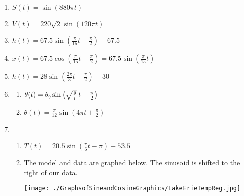 \documentclass{ximera}
\begin{document}
\begin{enumerate}
\setcounter{enumi}{\value{HW}}



\item  $S(t) = \sin\left(880\pi t\right)$

\item  $V(t) = 220 \sqrt{2} \sin\left(120\pi t\right)$


\item  $h(t) = 67.5 \sin\left(\frac{\pi}{15} t - \frac{\pi}{2} \right) + 67.5$

\item  $x(t) = 67.5 \cos\left(\frac{\pi}{15} t - \frac{\pi}{2} \right) = 67.5 \sin\left(\frac{\pi}{15} t \right)$


\item  $h(t) = 28\sin\left(\frac{2\pi}{3} t - \frac{\pi}{2}\right) + 30$


\item  

\begin{multicols}{2}
\begin{enumerate}

\item  $\theta(t) = \theta_{\text{\tiny $0$}} \sin\left(\sqrt{\frac{g}{l}}\, t + \frac{\pi}{2}\right)$

\item  $\theta(t) = \frac{\pi}{12} \sin\left(4\pi t + \frac{\pi}{2}\right)$
\end{enumerate}
\end{multicols}

\item  \begin{enumerate} \item  $T(t) = 20.5 \sin\left(\frac{\pi}{6} t - \pi\right) + 53.5$ 

\item  The model and data are graphed below.  The sinusoid is shifted to the right of our data.

\begin{center}

 \texttt{[image: ./GraphsofSineandCosineGraphics/LakeErieTempReg.jpg]} 


\end{center}
\end{enumerate}
\end{enumerate}
\end{document}
